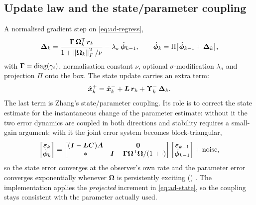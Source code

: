 \subsection{Update law and the state/parameter coupling}
A normalised gradient step on \eqref{eq:ad-regress},
\begin{equation}
\bm{\Delta}_k = \frac{\bm{\Gamma}\,\bm{\Omega}_k^{\mathsf{T}}\, \bm{r}_k}{1 + \left\lVert \bm{\Omega}_k \right\rVert_F^2/\nu}
 - \lambda_\sigma\,\hat{\bm{\phi}}_{k-1} ,
\qquad
\hat{\bm{\phi}}_k = \Pi\big[\hat{\bm{\phi}}_{k-1} + \bm{\Delta}_k\big] ,
\label{eq:ad-update}
\end{equation}
with $\bm{\Gamma} = \operatorname{diag}(\gamma_i)$, normalisation constant $\nu$, optional
$\sigma$-modification $\lambda_\sigma$ \cite{ioannou1996robust} and projection $\Pi$ onto the box.
The state update carries an extra term:
\begin{equation}
\hat{\bm{x}}^{+}_k = \hat{\bm{x}}^{-}_k + \bm{L}\,\bm{r}_k + \bm{\Upsilon}^-_k\,\bm{\Delta}_k .
\label{eq:ad-state}
\end{equation}
The last term is Zhang's state/parameter coupling.  Its role is to correct the state estimate for
the instantaneous change of the parameter estimate: without it the two error dynamics are coupled
in both directions and stability requires a small-gain argument; with it the joint error system
becomes block-triangular,
\begin{equation}
\begin{bmatrix}\bm{\varepsilon}_k\\ \tilde{\bm{\phi}}_k\end{bmatrix}
=\begin{bmatrix}(\bm{I}-\bm{L}\bm{C})\bm{A} & \bm{0}\\ \ast & \bm{I} - \bm{\Gamma}\bm{\Omega}^{\mathsf{T}}\bm{\Omega}/(1+\cdot)\end{bmatrix}
\begin{bmatrix}\bm{\varepsilon}_{k-1}\\ \tilde{\bm{\phi}}_{k-1}\end{bmatrix} + \text{noise} ,
\label{eq:ad-triangular}
\end{equation}
so the state error converges at the observer's own rate and the parameter error converges
exponentially whenever $\bm{\Omega}$ is persistently exciting ()
\cite[Thm.~1]{zhang2002adaptiveobserver}.  The implementation applies the \emph{projected}
increment in \eqref{eq:ad-state}, so the coupling stays consistent with the parameter actually
used.

